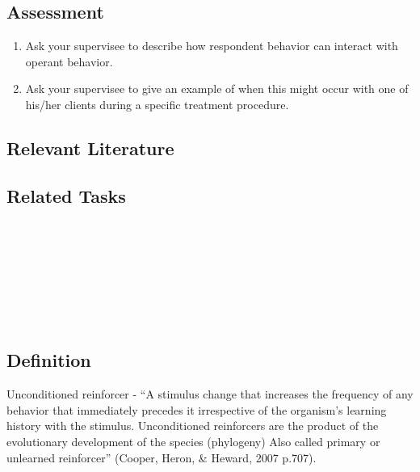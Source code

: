 \subsection{Assessment}
\begin{enumerate}
\item Ask your supervisee to describe how respondent behavior can interact with operant behavior.
\item Ask your supervisee to give an example of when this might occur with one of his/her clients during a specific treatment procedure.
\end{enumerate}
%
\subsection{Relevant Literature}
\begin{refsection}
\nocite{test,alang2017police,clayton2018black}
\printbibliography[heading=none]
\end{refsection}
%
\subsection{Related Tasks}
\fourgTwo{}\\
\fourgFive{}\\
\fourFKSeven{}\\
\fourFKThirteen{}\\
\fourFKFourteen{}\\
\fourFKFifteen{}\\
%
%
%
%
%
%
\section{\fourFKSeventeen{}}
\subsection{Definition}
Unconditioned reinforcer - ``A stimulus change that increases the frequency of any behavior that immediately precedes it irrespective of the organism's learning history with the stimulus. Unconditioned reinforcers are the product of the evolutionary development of the species (phylogeny) Also called primary or unlearned reinforcer'' (Cooper, Heron, \& Heward, 2007 p.707).

